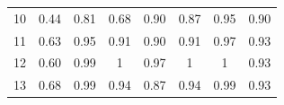 \documentclass[twoside,11pt]{article}
\begin{document}
\begin{table}[H]
{\begin{tabular}{cccccccc}
\multicolumn{1}{|c|}{10}    & \multicolumn{1}{c|}{0.44}                                                           & \multicolumn{1}{c|}{0.81}                                                                                     & \multicolumn{1}{c|}{0.68}                                                                               & \multicolumn{1}{c|}{\cellcolor[HTML]{ECF4FF}0.90}                                                       & \multicolumn{1}{c|}{0.87}                                                                               & \multicolumn{1}{c|}{\cellcolor[HTML]{FFCCC9}0.95}                                                          & \multicolumn{1}{c|}{\cellcolor[HTML]{ECF4FF}0.90}                                                          \\ \cline{1-1}
\multicolumn{1}{|c|}{11}    & \multicolumn{1}{c|}{0.63}                                                           & \multicolumn{1}{c|}{\cellcolor[HTML]{ECF4FF}0.95}                                                             & \multicolumn{1}{c|}{0.91}                                                                               & \multicolumn{1}{c|}{0.90}                                                                               & \multicolumn{1}{c|}{0.91}                                                                               & \multicolumn{1}{c|}{\cellcolor[HTML]{FFCCC9}0.97}                                                          & \multicolumn{1}{c|}{0.93}                                                                                  \\ \cline{1-1}
\multicolumn{1}{|c|}{12}    & \multicolumn{1}{c|}{0.60}                                                           & \multicolumn{1}{c|}{\cellcolor[HTML]{ECF4FF}0.99}                                                             & \multicolumn{1}{c|}{1}                                                                                  & \multicolumn{1}{c|}{0.97}                                                                               & \multicolumn{1}{c|}{\cellcolor[HTML]{FFCCC9}1}                                                          & \multicolumn{1}{c|}{\cellcolor[HTML]{FFCCC9}1}                                                             & \multicolumn{1}{c|}{0.93}                                                                                  \\ \cline{1-1}
\multicolumn{1}{|c|}{13}    & \multicolumn{1}{c|}{0.68}                                                           & \multicolumn{1}{c|}{\cellcolor[HTML]{FFCCC9}0.99}                                                             & \multicolumn{1}{c|}{\cellcolor[HTML]{ECF4FF}0.94}                                                       & \multicolumn{1}{c|}{0.87}                                                                               & \multicolumn{1}{c|}{\cellcolor[HTML]{ECF4FF}0.94}                                                       & \multicolumn{1}{c|}{\cellcolor[HTML]{FFCCC9}0.99}                                                          & \multicolumn{1}{c|}{0.93}                                                                                  \\ \cline{1-1}

\end{tabular}}
\end{table}
\end{document}
